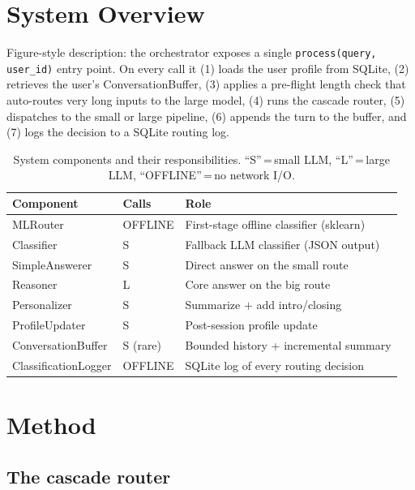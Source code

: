 \documentclass{article}
\begin{document}
\section{System Overview}
\label{sec:system}

Figure-style description: the orchestrator \citep[][\texttt{orchestrator.py}]{our_repo}
exposes a single \texttt{process(query, user\_id)} entry point. On every
call it (1) loads the user profile from SQLite, (2) retrieves the user's
ConversationBuffer, (3) applies a pre-flight length check that auto-routes
very long inputs to the large model, (4) runs the cascade router, (5)
dispatches to the small or large pipeline, (6) appends the turn to the
buffer, and (7) logs the decision to a SQLite routing log.

\begin{table}[h]
  \caption{System components and their responsibilities. ``S''\,=\,small LLM,
  ``L''\,=\,large LLM, ``OFFLINE''\,=\,no network I/O.}
  \label{tab:components}
  \centering
  \begin{tabular}{lll}
    \toprule
    Component & Calls & Role \\
    \midrule
    MLRouter       & OFFLINE & First-stage offline classifier (sklearn) \\
    Classifier     & S       & Fallback LLM classifier (JSON output) \\
    SimpleAnswerer & S       & Direct answer on the small route \\
    Reasoner       & L       & Core answer on the big route \\
    Personalizer   & S       & Summarize $+$ add intro/closing \\
    ProfileUpdater & S       & Post-session profile update \\
    ConversationBuffer & S (rare) & Bounded history + incremental summary \\
    ClassificationLogger & OFFLINE & SQLite log of every routing decision \\
    \bottomrule
  \end{tabular}
\end{table}

\section{Method}
\label{sec:method}

\subsection{The cascade router}
\label{sec:router}
\end{document}
